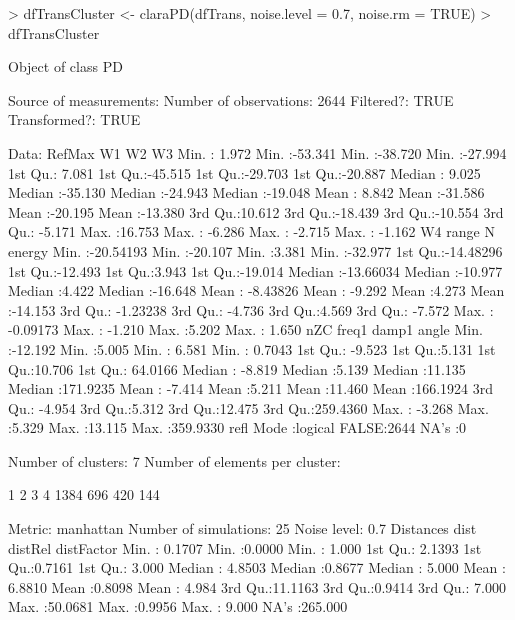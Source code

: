 \documentclass{article}
\renewenvironment{Schunk}{\begin{center}
    \scriptsize
    \begin{boxedminipage}{0.95\textwidth}}{
    \end{boxedminipage}\end{center}}
\begin{document}
\begin{Schunk}
\begin{Sinput}
> dfTransCluster <- claraPD(dfTrans, noise.level = 0.7, noise.rm = TRUE)
> dfTransCluster
\end{Sinput}
\begin{Soutput}
Object of class  PD 

Source of measurements:  
Number of observations:  2644 
Filtered?:  TRUE 
Transformed?: TRUE 

Data:
     RefMax             W1                W2                W3         
 Min.   : 1.972   Min.   :-53.341   Min.   :-38.720   Min.   :-27.994  
 1st Qu.: 7.081   1st Qu.:-45.515   1st Qu.:-29.703   1st Qu.:-20.887  
 Median : 9.025   Median :-35.130   Median :-24.943   Median :-19.048  
 Mean   : 8.842   Mean   :-31.586   Mean   :-20.195   Mean   :-13.380  
 3rd Qu.:10.612   3rd Qu.:-18.439   3rd Qu.:-10.554   3rd Qu.: -5.171  
 Max.   :16.753   Max.   : -6.286   Max.   : -2.715   Max.   : -1.162  
       W4                range               N             energy       
 Min.   :-20.54193   Min.   :-20.107   Min.   :3.381   Min.   :-32.977  
 1st Qu.:-14.48296   1st Qu.:-12.493   1st Qu.:3.943   1st Qu.:-19.014  
 Median :-13.66034   Median :-10.977   Median :4.422   Median :-16.648  
 Mean   : -8.43826   Mean   : -9.292   Mean   :4.273   Mean   :-14.153  
 3rd Qu.: -1.23238   3rd Qu.: -4.736   3rd Qu.:4.569   3rd Qu.: -7.572  
 Max.   : -0.09173   Max.   : -1.210   Max.   :5.202   Max.   :  1.650  
      nZC              freq1           damp1            angle         
 Min.   :-12.192   Min.   :5.005   Min.   : 6.581   Min.   :  0.7043  
 1st Qu.: -9.523   1st Qu.:5.131   1st Qu.:10.706   1st Qu.: 64.0166  
 Median : -8.819   Median :5.139   Median :11.135   Median :171.9235  
 Mean   : -7.414   Mean   :5.211   Mean   :11.460   Mean   :166.1924  
 3rd Qu.: -4.954   3rd Qu.:5.312   3rd Qu.:12.475   3rd Qu.:259.4360  
 Max.   : -3.268   Max.   :5.329   Max.   :13.115   Max.   :359.9330  
    refl        
 Mode :logical  
 FALSE:2644     
 NA's :0        
                
                
                
Number of clusters:  7 
Number of elements per cluster:

   1    2    3    4 
1384  696  420  144 

Metric:  manhattan 
Number of simulations:  25 
Noise level:  0.7 
Distances 
      dist            distRel         distFactor     
 Min.   : 0.1707   Min.   :0.0000   Min.   :  1.000  
 1st Qu.: 2.1393   1st Qu.:0.7161   1st Qu.:  3.000  
 Median : 4.8503   Median :0.8677   Median :  5.000  
 Mean   : 6.8810   Mean   :0.8098   Mean   :  4.984  
 3rd Qu.:11.1163   3rd Qu.:0.9414   3rd Qu.:  7.000  
 Max.   :50.0681   Max.   :0.9956   Max.   :  9.000  
                                    NA's   :265.000  
\end{Soutput}
\end{Schunk}
\end{document}
